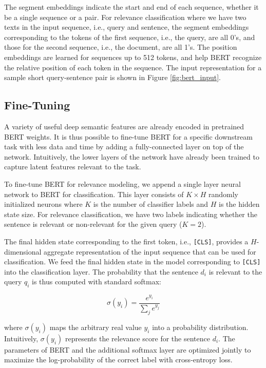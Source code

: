 The segment embeddings indicate the start and end of each sequence, whether it be a single sequence or a pair.
For relevance classification where we have two texts in the input sequence, i.e., query and sentence, the segment embeddings corresponding to the tokens of the first sequence, i.e., the query, are all 0's, and those for the second sequence, i.e., the document, are all 1's.
The position embeddings are learned for sequences up to 512 tokens, and help BERT recognize the relative position of each token in the sequence.
The input representation for a sample short query-sentence pair is shown in Figure \ref{fig:bert_input}.


\subsection{Fine-Tuning}

A variety of useful deep semantic features are already encoded in pretrained BERT weights.
It is thus possible to fine-tune BERT for a specific downstream task with less data and time by adding a fully-connected layer on top of the network.
Intuitively, the lower layers of the network have already been trained to capture latent features relevant to the task.

To fine-tune BERT for relevance modeling, we append a single layer neural network to BERT for classification.
This layer consists of $ K \times H $ randomly initialized neurons where $ K $ is the number of classifier labels and $ H$ is the hidden state size.
For relevance classification, we have two labels indicating whether the sentence is relevant or non-relevant for the given query ($ K = 2 $).

The final hidden state corresponding to the first token, i.e., \texttt{[CLS]}, provides a $ H $-dimensional aggregate representation of the input sequence that can be used for classification.
We feed the final hidden state in the model corresponding to \texttt{[CLS]} into the classification layer.
The probability that the sentence $ d_i $ is relevant to the query $ q_i $ is thus computed with standard softmax:
 
\begin{equation}
\sigma (y_i) = \frac{e^{y_i}}{\sum_j e^{y_j}}
\end{equation}

\noindent where $\sigma (y_i)$ maps the arbitrary real value $ y_i $ into a probability distribution.
Intuitively, $\sigma (y_i)$ represents the relevance score for the sentence $ d_i $.
The parameters of BERT and the additional softmax layer are optimized jointly to maximize the log-probability of the correct label with cross-entropy loss.

